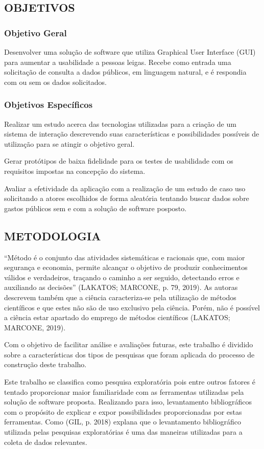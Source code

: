 \subsection{OBJETIVOS}

\subsubsection{Objetivo Geral}
Desenvolver uma solução de software que utiliza Graphical User Interface (GUI) para aumentar a usabilidade a pessoas leigas. Recebe como entrada uma solicitação de consulta  a dados públicos, em linguagem natural, e é respondia com ou sem os dados solicitados.

\subsubsection{Objetivos Específicos}
Realizar um estudo acerca das tecnologias utilizadas para a criação de um sistema de interação descrevendo suas características e possibilidades possíveis de utilização para se atingir o objetivo geral.

Gerar protótipos de baixa fidelidade para os testes de usabilidade com os requisitos impostas na concepção do sistema.

Avaliar a efetividade da aplicação com a realização de um estudo de caso uso solicitando a atores escolhidos de forma aleatória tentando buscar dados sobre gastos públicos sem e com a solução de software posposto.

\subsection{METODOLOGIA}
“Método é o conjunto das atividades sistemáticas e racionais que, com maior segurança e economia, permite alcançar o objetivo de produzir conhecimentos válidos e verdadeiros, traçando o caminho a ser seguido, detectando erros e auxiliando as decisões” (LAKATOS; MARCONE, p. 79, 2019). As autoras descrevem também que a ciência caracteriza-se pela utilização de métodos científicos e que estes não são de uso exclusivo pela ciência. Porém, não é possível a ciência estar apartado do emprego de métodos científicos (LAKATOS; MARCONE, 2019).

Com o objetivo de facilitar análise e avaliações futuras, este trabalho é dividido sobre a características dos tipos de pesquisas que foram aplicada do processo de construção deste trabalho.

Este trabalho se classifica como pesquisa exploratória pois entre outros fatores é tentado proporcionar maior familiaridade com as ferramentas utilizadas pela solução de software proposta. Realizando para isso,  levantamento bibliográficos com o propósito de explicar e expor possibilidades proporcionadas por estas ferramentas. Como (GIL, p.  2018) explana que o levantamento bibliográfico utilizada pelas pesquisas exploratórias é uma das maneiras utilizadas para  a coleta de dados relevantes.


